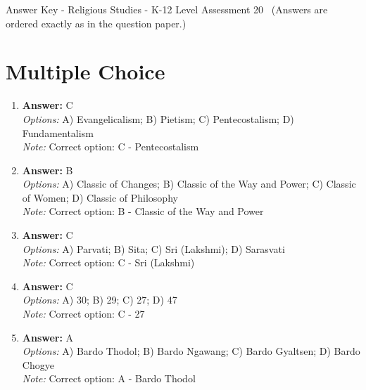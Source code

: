 \documentclass[12pt]{article}
\begin{document}
\begin{center}
Answer Key - Religious Studies - K-12 Level Assessment 20 \
\small (Answers are ordered exactly as in the question paper.)
\end{center}

\section*{Multiple Choice}
\begin{enumerate}[label=\arabic*.]
\item \textbf{Answer:} C
\\ \textit{Options:} A) Evangelicalism; B) Pietism; C) Pentecostalism; D) Fundamentalism
\\ \textit{Note:} Correct option: C - Pentecostalism
\item \textbf{Answer:} B
\\ \textit{Options:} A) Classic of Changes; B) Classic of the Way and Power; C) Classic of Women; D) Classic of Philosophy
\\ \textit{Note:} Correct option: B - Classic of the Way and Power
\item \textbf{Answer:} C
\\ \textit{Options:} A) Parvati; B) Sita; C) Sri (Lakshmi); D) Sarasvati
\\ \textit{Note:} Correct option: C - Sri (Lakshmi)
\item \textbf{Answer:} C
\\ \textit{Options:} A) 30; B) 29; C) 27; D) 47
\\ \textit{Note:} Correct option: C - 27
\item \textbf{Answer:} A
\\ \textit{Options:} A) Bardo Thodol; B) Bardo Ngawang; C) Bardo Gyaltsen; D) Bardo Chogye
\\ \textit{Note:} Correct option: A - Bardo Thodol
\end{enumerate}
\end{document}

